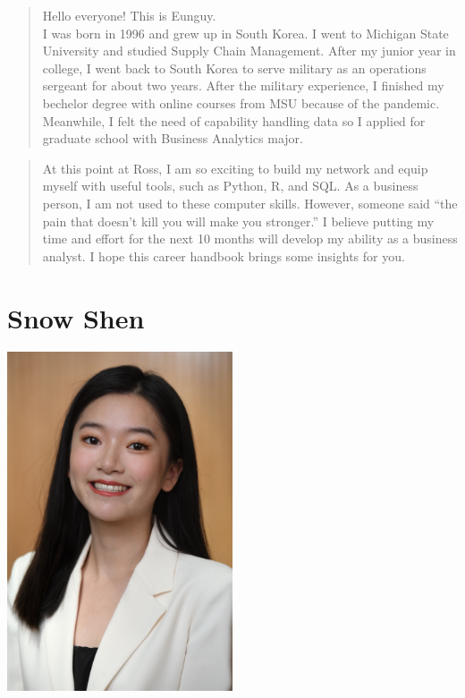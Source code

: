 \documentclass[
]{book}
\begin{document}
\begin{quote}
Hello everyone! This is Eunguy.\\
I was born in 1996 and grew up in South Korea. I went to Michigan State University and studied Supply Chain Management. After my junior year in college, I went back to South Korea to serve military as an operations sergeant for about two years. After the military experience, I finished my bechelor degree with online courses from MSU because of the pandemic. Meanwhile, I felt the need of capability handling data so I applied for graduate school with Business Analytics major.
\end{quote}

\begin{quote}
At this point at Ross, I am so exciting to build my network and equip myself with useful tools, such as Python, R, and SQL. As a business person, I am not used to these computer skills. However, someone said ``the pain that doesn't kill you will make you stronger.'' I believe putting my time and effort for the next 10 months will develop my ability as a business analyst. I hope this career handbook brings some insights for you.
\end{quote}

\hypertarget{snow-shen-1}{%
\section*{Snow Shen}\label{snow-shen-1}}

\includegraphics[width=0.5\textwidth,height=\textheight]{Images/Snow.png}
\end{document}
